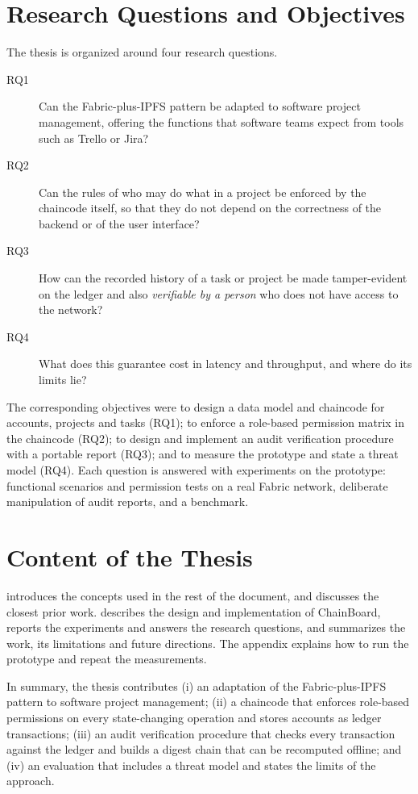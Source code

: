 \section{Research Questions and Objectives}
\label{sec:rqs}

The thesis is organized around four research questions.

\begin{description}
    \item[RQ1] Can the Fabric-plus-IPFS pattern be adapted to software project management, offering the functions that software teams expect from tools such as Trello or Jira?
    \item[RQ2] Can the rules of who may do what in a project be enforced by the chaincode itself, so that they do not depend on the correctness of the backend or of the user interface?
    \item[RQ3] How can the recorded history of a task or project be made tamper-evident on the ledger and also \emph{verifiable by a person} who does not have access to the network?
    \item[RQ4] What does this guarantee cost in latency and throughput, and where do its limits lie?
\end{description}

The corresponding objectives were to design a data model and chaincode for accounts, projects and tasks (RQ1); to enforce a role-based permission matrix in the chaincode (RQ2); to design and implement an audit verification procedure with a portable report (RQ3); and to measure the prototype and state a threat model (RQ4). Each question is answered with experiments on the prototype: functional scenarios and permission tests on a real Fabric network, deliberate manipulation of audit reports, and a benchmark.

\section{Content of the Thesis}
\label{sec:content}

 introduces the concepts used in the rest of the document, and  discusses the closest prior work.  describes the design and implementation of ChainBoard,  reports the experiments and answers the research questions, and  summarizes the work, its limitations and future directions. The appendix explains how to run the prototype and repeat the measurements.

In summary, the thesis contributes (i) an adaptation of the Fabric-plus-IPFS pattern to software project management; (ii) a chaincode that enforces role-based permissions on every state-changing operation and stores accounts as ledger transactions; (iii) an audit verification procedure that checks every transaction against the ledger and builds a digest chain that can be recomputed offline; and (iv) an evaluation that includes a threat model and states the limits of the approach.
